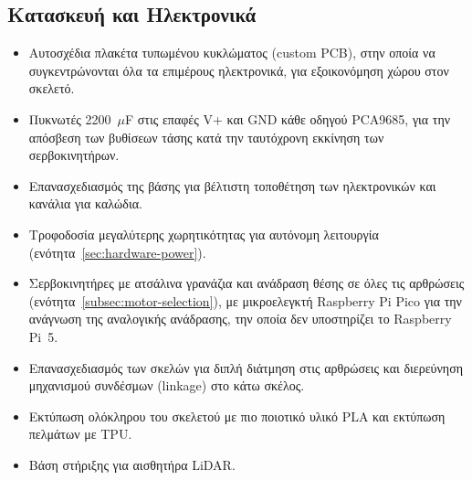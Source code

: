 \documentclass[11pt]{report}
\begin{document}
\subsection{Κατασκευή και Ηλεκτρονικά}
\begin{itemize}
  \item Αυτοσχέδια πλακέτα τυπωμένου κυκλώματος (custom PCB), στην οποία να
  συγκεντρώνονται όλα τα επιμέρους ηλεκτρονικά, για εξοικονόμηση χώρου στον
  σκελετό.
  \item Πυκνωτές 2200~$\mu$F στις επαφές V+ και GND κάθε οδηγού PCA9685, για
  την απόσβεση των βυθίσεων τάσης κατά την ταυτόχρονη εκκίνηση των
  σερβοκινητήρων.
  \item Επανασχεδιασμός της βάσης για βέλτιστη τοποθέτηση των ηλεκτρονικών και κανάλια για καλώδια.
  \item Τροφοδοσία μεγαλύτερης χωρητικότητας για αυτόνομη λειτουργία
  (ενότητα~\ref{sec:hardware-power}).
  \item Σερβοκινητήρες με ατσάλινα γρανάζια και ανάδραση θέσης σε όλες τις
  αρθρώσεις (ενότητα~\ref{subsec:motor-selection}), με μικροελεγκτή Raspberry
  Pi Pico για την ανάγνωση της αναλογικής ανάδρασης, την οποία δεν υποστηρίζει
  το Raspberry Pi~5.
  \item Επανασχεδιασμός των σκελών για διπλή διάτμηση στις αρθρώσεις και
  διερεύνηση μηχανισμού συνδέσμων (linkage) στο κάτω σκέλος.
  \item Εκτύπωση ολόκληρου του σκελετού με πιο ποιοτικό υλικό PLA και εκτύπωση πελμάτων με TPU.
  \item Βάση στήριξης για αισθητήρα LiDAR.
\end{itemize}
\end{document}
